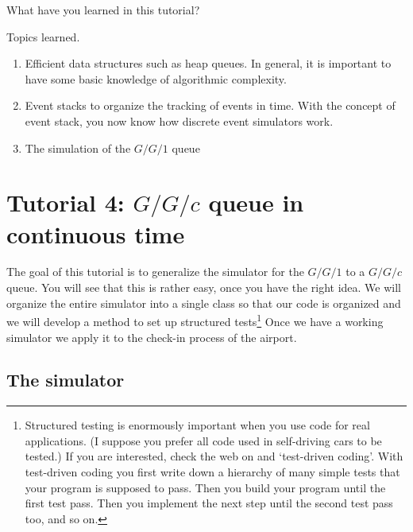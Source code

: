 \begin{exercise}
  What have you learned in this tutorial?
  \begin{solution}
    Topics learned.
    \begin{enumerate}
    \item Efficient data structures such as heap queues. In general, it is important to have some basic knowledge of algorithmic complexity. 
    \item Event stacks to organize the tracking of events in time. With the concept of event stack, you now know how discrete event simulators work. 
    \item The simulation of the $G/G/1$ queue
    \end{enumerate}
  \end{solution}
\end{exercise}


\clearpage


\section{Tutorial 4: $G/G/c$ queue in continuous time}
\label{sec:ggc-continuous-time}

The goal of this tutorial is to  generalize the simulator for the $G/G/1$ to a $G/G/c$ queue. You will see that this is rather easy, once you have the right idea. We will organize the entire simulator into a single class so that our code is organized and we will develop a method to set up structured  tests\footnote{Structured testing is enormously important when you use code for real applications. (I suppose you prefer all code used in self-driving cars to be tested.)  If you are interested, check the web on   and `test-driven coding'. With test-driven coding you first write down a hierarchy of  many simple tests that your program is supposed to pass.  Then you build your program until the first test pass. Then you implement the next step until the second test pass too, and so on.} Once we have a working simulator we apply it to the check-in process of the airport. 



\subsection{The simulator}
\label{sec:simulator}

